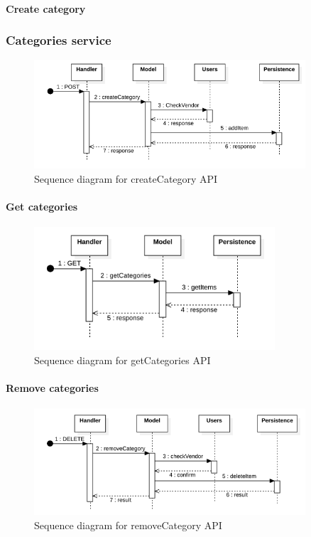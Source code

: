 \paragraph*{Create category}
\subsubsection{Categories service}
\begin{figure}[H]
    \includegraphics[width=0.9\textwidth]{res/images/sequence-diagrams/categories/createCategory.png}
    \caption{Sequence diagram for createCategory API}
\end{figure}

\paragraph*{Get categories}
\begin{figure}[H]
    \includegraphics[width=0.8\textwidth]{res/images/sequence-diagrams/categories/getCategories.png}
    \caption{Sequence diagram for getCategories API}
\end{figure}

\paragraph*{Remove categories}
\begin{figure}[H]
    \includegraphics[width=0.9\textwidth]{res/images/sequence-diagrams/categories/removeCategory.png}
    \caption{Sequence diagram for removeCategory API}
\end{figure}

